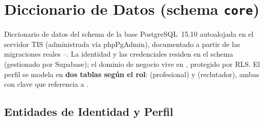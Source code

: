 \clearpage

\chapter{Diccionario de Datos (schema \texttt{core})}
\label{cap:anexo_datos}

Diccionario de datos del schema  de la base PostgreSQL~15.10 autoalojada en el
servidor TIS (administrada vía phpPgAdmin),
documentado a partir de las migraciones reales --. La identidad y las
credenciales residen en el schema  (gestionado por Supabase); el dominio de negocio
vive en , protegido por RLS. El perfil se modela en \textbf{dos tablas según el
rol}:  (profesional) y  (reclutador), ambas
con clave  que referencia a .\par

\section{Entidades de Identidad y Perfil}
\label{sec:anexo_datos_perfil}

